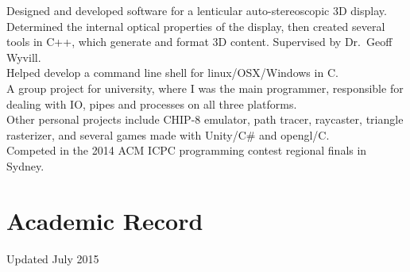 \documentclass[a4paper, oneside, final]{scrartcl}
\begin{document}
	\noindent
	Designed and developed software for a lenticular auto-stereoscopic 3D display.\\ 
	Determined the internal optical properties of the display, then created several tools in C++, which generate and format 3D content. Supervised by Dr.\ Geoff Wyvill.\\

	\noindent
	Helped develop a command line shell for linux/OSX/Windows in C.\\
	A group project for university, where I was the main programmer, responsible for dealing with IO, pipes and processes on all three platforms.\\

	\noindent
	Other personal projects include CHIP-8 emulator, path tracer, raycaster, triangle rasterizer, and several games made with Unity/C\# and opengl/C.\\

	\noindent
	Competed in the 2014 ACM ICPC programming contest regional finals in Sydney.\\
    
	\iffalse
      \pagebreak
      \section{Academic Record}
      Updated July 2015
\end{document}
